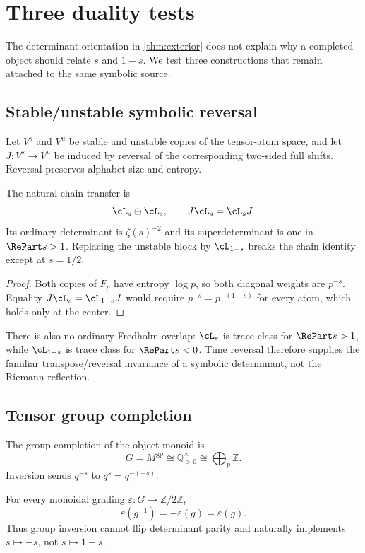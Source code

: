 \section{Three duality tests}

The determinant orientation in \cref{thm:exterior} does not explain why a
completed object should relate $s$ and $1-s$. We test three constructions
that remain attached to the same symbolic source.

\subsection{Stable/unstable symbolic reversal}

Let $V^s$ and $V^u$ be stable and unstable copies of the tensor-atom space,
and let $J:V^s\to V^u$ be induced by reversal of the corresponding two-sided
full shifts. Reversal preserves alphabet size and entropy.

\begin{proposition}
\label{prop:reversal}
The natural chain transfer is
\[
  \cL_s\oplus\cL_s,
  \qquad J\cL_s=\cL_sJ.
\]
Its ordinary determinant is $\zeta(s)^{-2}$ and its superdeterminant is one
in $\RePart s>1$. Replacing the unstable block by $\cL_{1-s}$ breaks the
chain identity except at $s=1/2$.
\end{proposition}

\begin{proof}
Both copies of $F_p$ have entropy $\log p$, so both diagonal weights are
$p^{-s}$. Equality $J\cL_s=\cL_{1-s}J$ would require
$p^{-s}=p^{-(1-s)}$ for every atom, which holds only at the center.
\end{proof}

There is also no ordinary Fredholm overlap: $\cL_s$ is trace class for
$\RePart s>1$, while $\cL_{1-s}$ is trace class for $\RePart s<0$.
Time reversal therefore supplies the familiar transpose/reversal invariance
of a symbolic determinant, not the Riemann reflection.

\subsection{Tensor group completion}

The group completion of the object monoid is
\[
  G=M^{\mathrm{gp}}\cong\mathbb Q_{>0}^{\times}
  \cong\bigoplus_p\mathbb Z.
\]
Inversion sends $q^{-s}$ to $q^s=q^{-(-s)}$.

\begin{proposition}
\label{prop:inversion}
For every monoidal grading
$\varepsilon:G\to\mathbb Z/2\mathbb Z$,
\[
  \varepsilon(g^{-1})=-\varepsilon(g)=\varepsilon(g).
\]
Thus group inversion cannot flip determinant parity and naturally implements
$s\mapsto-s$, not $s\mapsto1-s$.
\end{proposition}

